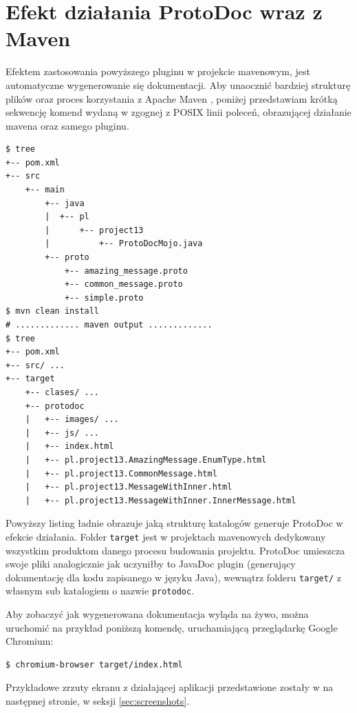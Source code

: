 \documentclass[pdflatex,11pt]{aghdpl}
\begin{document}
\section{Efekt działania ProtoDoc wraz z Maven}
Efektem zastosowania powyższego pluginu w projekcie mavenowym, jest automatyczne wygenerowanie się dokumentacji.
Aby unaocznić bardziej strukturę plików oraz proces korzystania z Apache Maven \cite{Maven}, poniżej przedstawiam krótką sekwencję komend
wydaną w zgognej z POSIX linii poleceń, obrazującej działanie mavena oraz samego pluginu.

\begin{verbatim}
$ tree
+-- pom.xml
+-- src
    +-- main
        +-- java
        |  +-- pl
        |      +-- project13
        |          +-- ProtoDocMojo.java
        +-- proto
            +-- amazing_message.proto
            +-- common_message.proto
            +-- simple.proto
$ mvn clean install
# ............. maven output .............
$ tree
+-- pom.xml
+-- src/ ...
+-- target
    +-- clases/ ...
    +-- protodoc
    |   +-- images/ ...
    |   +-- js/ ...
    |   +-- index.html 
    |   +-- pl.project13.AmazingMessage.EnumType.html
    |   +-- pl.project13.CommonMessage.html
    |   +-- pl.project13.MessageWithInner.html
    |   +-- pl.project13.MessageWithInner.InnerMessage.html
\end{verbatim}

Powyższy listing ładnie obrazuje jaką strukturę katalogów generuje ProtoDoc w efekcie działania.
Folder \verb|target| jest w projektach mavenowych dedykowany wszystkim produktom danego procesu budowania projektu.
ProtoDoc umieszcza swoje pliki analogicznie jak uczyniłby to JavaDoc plugin (generujący dokumentację dla kodu zapisanego w języku Java),
wewnątrz folderu \verb|target/| z własnym sub katalogiem o nazwie \verb|protodoc|.

Aby zobaczyć jak wygenerowana dokumentacja wyląda na żywo, można uruchomić na przykład poniższą komendę, uruchamiającą przeglądarkę Google Chromium:

\begin{lstlisting}
$ chromium-browser target/index.html
\end{lstlisting}

Przykładowe zrzuty ekranu z działającej aplikacji przedstawione zostały w na następnej stronie, w seksji \ref{sec:screenshots}.

\newpage
\end{document}
